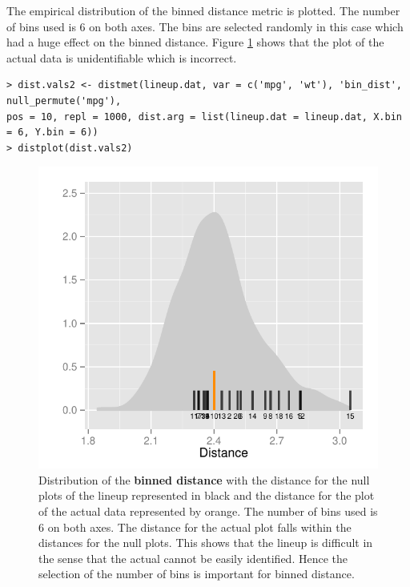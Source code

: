 \documentclass[article]{jss}
\begin{document}
\newpage

The empirical distribution of the binned distance metric is plotted. The number of bins used is 6 on both axes. The bins are selected randomly in this case which had a huge effect on the binned distance. Figure \ref{dist-bin-1} shows that the plot of the actual data is unidentifiable which is incorrect. 

\begin{verbatim}
> dist.vals2 <- distmet(lineup.dat, var = c('mpg', 'wt'), 'bin_dist', null_permute('mpg'), 
pos = 10, repl = 1000, dist.arg = list(lineup.dat = lineup.dat, X.bin = 6, Y.bin = 6))
> distplot(dist.vals2)
\end{verbatim}

\begin{figure}[hbtp]
\begin{center}
\includegraphics[scale=0.7]{nullabor-distr-bin-1.pdf}
\caption{Distribution of the \textbf{binned distance} with the distance for the null plots of the lineup represented in black and the distance for the plot of the actual data represented by orange. The number of bins used is 6 on both axes. The distance for the actual plot falls within the distances for the null plots. This shows that the lineup is difficult in the sense that the actual cannot be easily identified.  Hence the selection of the number of bins is important for binned distance. }
\label{dist-bin-1}
\end{center}
\end{figure}
\end{document}

